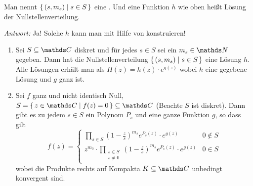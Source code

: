 Man nennt $\left\{\,(s, m_s) \mid s\in S\,\right\}$ eine .
Und eine Funktion $h$ wie oben heißt Lösung der Nullstellenverteilung.

\emph{Antwort:} Ja! Solche $h$ kann man mit Hilfe von  konstruieren!

\begin{satz}
\begin{enumerate}
\item Sei $S\subseteq \CC$ diskret und für jedes $s\in S$ sei ein $m_s \in \NN$ gegeben. Dann hat die Nullstellenverteilung $\left\{\,(s, m_s) \mid s\in S\,\right\}$ eine Lösung $h$.
Alle Lösungen erhält man als $H(z) = h(z)\cdot e^{g(z)}$ wobei $h$ eine gegebene Lösung und $g$ ganz ist.

\item Sei $f$ ganz und nicht identisch Null, $S=\Set{z\in\CC \mid f(z) = 0}\subseteq\CC$ (Beachte $S$ ist diskret).
Dann gibt es zu jedem $s\in S$ ein Polynom $P_s$ und eine ganze Funktion $g$, so dass gilt
\[
	f(z) =
	\begin{cases}
		\displaystyle \prod_{s\in S} \left(1-\frac{z}{s}\right)^{m_s} e^{P_s(z)}\cdot e^{g(z)} & 0 \not\in S \\
		\displaystyle z^{m_0} \cdot \prod_{\substack{s\in S\\ \scriptscriptstyle s\not=0}} \left(1-\frac{z}{s}\right)^{m_s} e^{P_s(z)}\cdot e^{g(z)} & 0 \in S
	\end{cases}
\]
wobei die Produkte rechts auf Kompakta $K\subseteq \CC$ unbedingt konvergent sind.
\end{enumerate}
\end{satz}